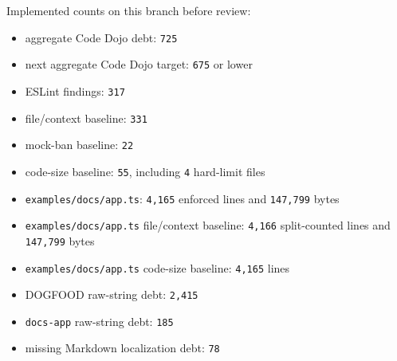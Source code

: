 Implemented counts on this branch before review:

\begin{itemize}
\tightlist
\item
  aggregate Code Dojo debt: \texttt{7\allowbreak{}2\allowbreak{}5}
\item
  next aggregate Code Dojo target: \texttt{6\allowbreak{}7\allowbreak{}5} or lower
\item
  ESLint findings: \texttt{3\allowbreak{}1\allowbreak{}7}
\item
  file/context baseline: \texttt{3\allowbreak{}3\allowbreak{}1}
\item
  mock-ban baseline: \texttt{2\allowbreak{}2}
\item
  code-size baseline: \texttt{5\allowbreak{}5}, including \texttt{4} hard-limit files
\item
  \texttt{e\allowbreak{}x\allowbreak{}a\allowbreak{}m\allowbreak{}p\allowbreak{}l\allowbreak{}e\allowbreak{}s\allowbreak{}/\allowbreak{}d\allowbreak{}o\allowbreak{}c\allowbreak{}s\allowbreak{}/\allowbreak{}a\allowbreak{}p\allowbreak{}p\allowbreak{}.\allowbreak{}t\allowbreak{}s}: \texttt{4\allowbreak{},\allowbreak{}1\allowbreak{}6\allowbreak{}5} enforced lines and \texttt{1\allowbreak{}4\allowbreak{}7\allowbreak{},\allowbreak{}7\allowbreak{}9\allowbreak{}9} bytes
\item
  \texttt{e\allowbreak{}x\allowbreak{}a\allowbreak{}m\allowbreak{}p\allowbreak{}l\allowbreak{}e\allowbreak{}s\allowbreak{}/\allowbreak{}d\allowbreak{}o\allowbreak{}c\allowbreak{}s\allowbreak{}/\allowbreak{}a\allowbreak{}p\allowbreak{}p\allowbreak{}.\allowbreak{}t\allowbreak{}s} file/context baseline: \texttt{4\allowbreak{},\allowbreak{}1\allowbreak{}6\allowbreak{}6} split-counted lines and \texttt{1\allowbreak{}4\allowbreak{}7\allowbreak{},\allowbreak{}7\allowbreak{}9\allowbreak{}9} bytes
\item
  \texttt{e\allowbreak{}x\allowbreak{}a\allowbreak{}m\allowbreak{}p\allowbreak{}l\allowbreak{}e\allowbreak{}s\allowbreak{}/\allowbreak{}d\allowbreak{}o\allowbreak{}c\allowbreak{}s\allowbreak{}/\allowbreak{}a\allowbreak{}p\allowbreak{}p\allowbreak{}.\allowbreak{}t\allowbreak{}s} code-size baseline: \texttt{4\allowbreak{},\allowbreak{}1\allowbreak{}6\allowbreak{}5} lines
\item
  DOGFOOD raw-string debt: \texttt{2\allowbreak{},\allowbreak{}4\allowbreak{}1\allowbreak{}5}
\item
  \texttt{d\allowbreak{}o\allowbreak{}c\allowbreak{}s\allowbreak{}-\allowbreak{}a\allowbreak{}p\allowbreak{}p} raw-string debt: \texttt{1\allowbreak{}8\allowbreak{}5}
\item
  missing Markdown localization debt: \texttt{7\allowbreak{}8}
\end{itemize}

